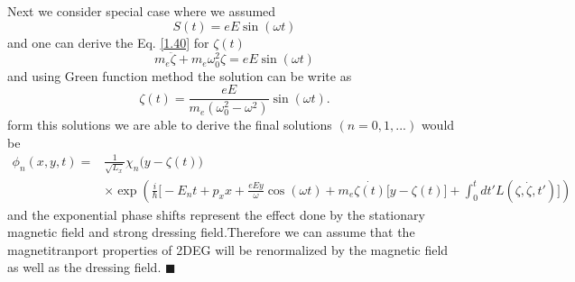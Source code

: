 \documentclass[a4paper]{article}
\numberwithin{equation}{subsection}
\numberwithin{equation}{section}
\begin{document}
\noindent
Next we consider special case where we assumed
\begin{equation} \label{1.49}
  S(t) = eE\sin(\omega t)
\end{equation}
and one can derive the Eq. \eqref{1.40} for $\zeta(t)$
\begin{equation} \label{1.50}
  m_e\ddot{\zeta} + m_e\omega_0^2\zeta = eE\sin(\omega t)
\end{equation}
and using Green function method the solution can be write as
\begin{equation} \label{1.51}
  \zeta(t) = \frac{eE}{m_e(\omega_0^2 - \omega^2)}\sin(\omega t).
\end{equation}
form this solutions we are able to derive the final solutions $(n=0,1,...)$ would be
\begin{equation} \label{1.52}
  \begin{aligned}
    \phi_n(x,y,t)  = & \frac{1}{\sqrt{L_x}} \chi_n\big(y - \zeta(t)\big) \\
    & \times
      \exp(
     \frac{i}{\hbar}\bigg[- E_nt +
    p_x x +
    \frac{eEy}{\omega}\cos(\omega t)+
    m_e\dot{\zeta(t)}\big[y-\zeta(t)\big]
     + \int_0^{t}dt'L(\zeta,\dot{\zeta},t')\bigg])
  \end{aligned}
\end{equation}
and the exponential phase shifts represent the effect done by the stationary magnetic field and strong dressing field.Therefore we can assume that the magnetitranport properties of 2DEG will be renormalized by the magnetic field as well as the dressing field.
\hfill$\blacksquare$
\end{document}
